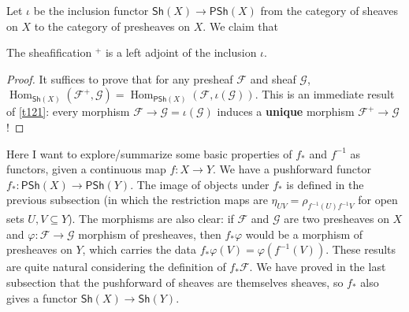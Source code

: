 \documentclass[12pt,letter]{article}
\newcommand{\Hom}[0]{\operatorname{Hom}}
\begin{document}
	Let $\iota$ be the inclusion functor $\mathsf{Sh}(X)\to \mathsf{PSh}(X)$ from the category of sheaves on $X$ to the category of presheaves on $X$. We claim that
	\begin{lemma}\label{l141}
		The sheafification ${}^+$ is a left adjoint of the inclusion $\iota$.
	\end{lemma}
	\begin{proof}
		It suffices to prove that for any presheaf $\mathscr F$ and sheaf $\mathscr G$, $\Hom_{\mathsf{Sh}(X)}(\mathscr F^+,\mathscr G)=\Hom_{\mathsf{PSh}(X)}(\mathscr F,\iota(\mathscr G))$. This is an immediate result of \autoref{t121}: every morphism $\mathscr F\to \mathscr G=\iota(\mathscr G)$ induces a \textbf{unique} morphism $\mathscr F^+\to \mathscr G$!
	\end{proof}
	Here I want to explore/summarize some basic properties of $f_*$ and $f^{-1}$ as functors, given a continuous map $f:X\to Y$. We have a pushforward functor $f_*:\mathsf{PSh}(X)\to\mathsf{PSh}(Y)$. The image of objects under $f_*$ is defined in the previous subsection (in which the restriction maps are $\eta_{UV}=\rho_{f^{-1}(U)f^{-1}V}$ for open sets $U, V\subseteq Y$). The morphisms are also clear: if $\mathscr F$ and $\mathscr G$ are two presheaves on $X$ and $\varphi:\mathscr F\to\mathscr G$ morphism of presheaves, then $f_*\varphi$ would be a morphism of presheaves on $Y$, which carries the data $f_*\varphi(V)=\varphi(f^{-1}(V))$. These results are quite natural considering the definition of $f_*\mathscr F$. We have proved in the last subsection that the pushforward of sheaves are themselves sheaves, so $f_*$ also gives a functor $\mathsf{Sh}(X)\to\mathsf{Sh}(Y)$.
\end{document}
